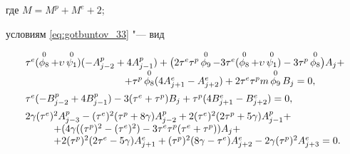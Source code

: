 где $M=M^{p} +M^{e} +2$;



\noindent

условиям \eqref{eq:gotbuntov_33} "--- вид

\begin{equation}

\hspace{-1cm}

\begin{array}{l}

\tau^e (\mathop{\phi_8}\limits^{0}+\upsilon  \mathop{\psi_1}\limits^{0})

(-A_{j-2}^p+4A_{j-1}^p)+\bigl(2\tau^e\tau^p\mathop{\phi_9}\limits^{0}-3\tau^e(\mathop{\phi_8}\limits^{0}+\upsilon  \mathop{\psi_1}\limits^{0})-

3\tau^p\mathop{\phi_8}\limits^{0}\bigr)A_j+

\\

\hspace{3.5cm}

+\tau^p\mathop{\phi_8}\limits^{0}(4A_{j+1}^e-A_{j+2}^e)+2\tau^e\tau^p m\mathop{\phi_9}\limits^{0}B_j=0,

\\[2mm]

\tau^e(-B_{j-2}^p+4B_{j-1}^p)-3(\tau^e+\tau^p)B_j+\tau^p(4B_{j+1}^e-B_{j+2}^e)=0,

\\[2mm]

2\gamma(\tau^e)^2A_{j-3}^p-(\tau^e)^2(\tau^p+8\gamma)A_{j-2}^p+2(\tau^e)^2(2\tau^p+5\gamma)A_{j-1}^p+

\\

\hspace{1cm}

+(4\gamma((\tau^p)^2-(\tau^e)^2)-3\tau^e\tau^p(\tau^e+\tau^p))A_j+

\\

\hspace{1cm}

+2(\tau^p)^2(2\tau^e-5\gamma)A_{j+1}^e+(\tau^p)^2(8\gamma-\tau^e)A_{j+2}^e-2\gamma(\tau^p)^2 A_{j+3}^e=0.

\end{array}        \hspace{-1cm}  

\label{eq:gotbuntov_43}

\end{equation} 

